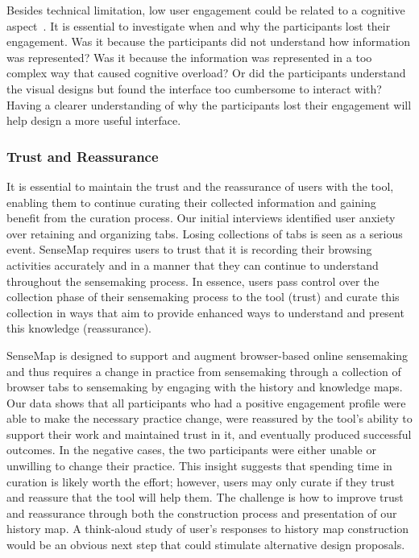 Besides technical limitation, low user engagement could be related to a cognitive aspect~\cite{OBrien2008,Peters2009}. It is essential to investigate when and why the participants lost their engagement. Was it because the participants did not understand how information was represented? Was it because the information was represented in a too complex way that caused cognitive overload? Or did the participants understand the visual designs but found the interface too cumbersome to interact with? Having a clearer understanding of why the participants lost their engagement will help design a more useful interface.

\subsubsection{Trust and Reassurance}
It is essential to maintain the trust and the reassurance of users with the tool, enabling them to continue curating their collected information and gaining benefit from the curation process. Our initial interviews identified user anxiety over retaining and organizing tabs. Losing collections of tabs is seen as a serious event. SenseMap requires users to trust that it is recording their browsing activities accurately and in a manner that they can continue to understand throughout the sensemaking process. In essence, users pass control over the collection phase of their sensemaking process to the tool (trust) and curate this collection in ways that aim to provide enhanced ways to understand and present this knowledge (reassurance).

SenseMap is designed to support and augment browser-based online sensemaking and thus requires a change in practice from sensemaking through a collection of browser tabs to sensemaking by engaging with the history and knowledge maps. Our data shows that all participants who had a positive engagement profile were able to make the necessary practice change, were reassured by the tool's ability to support their work and maintained trust in it, and eventually produced successful outcomes. In the negative cases, the two participants were either unable or unwilling to change their practice. This insight suggests that spending time in curation is likely worth the effort; however, users may only curate if they trust and reassure that the tool will help them. The challenge is how to improve trust and reassurance through both the construction process and presentation of our history map. A think-aloud study of user's responses to history map construction would be an obvious next step that could stimulate alternative design proposals.

